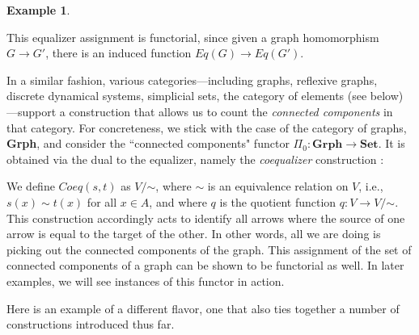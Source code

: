 \documentclass[a4paper]{book}
\theoremstyle{definition}
\newtheorem{example}{Example}[section]
\theoremstyle{definition}
\theoremstyle{definition}
\theoremstyle{theorem}
\theoremstyle{definition}
\begin{document}
\begin{example}
	\begin{center} 
	\end{center} 
	This equalizer assignment is functorial, since given a graph homomorphism $G \rightarrow G'$, there is an induced function $Eq(G) \rightarrow Eq(G')$. \par 
	 In a similar fashion, various categories---including graphs, reflexive graphs, discrete dynamical systems, simplicial sets, the category of elements (see below)---support a construction that allows us to count the \textit{connected components} in that category. For concreteness, we stick with the case of the category of graphs, \textbf{Grph}, and consider the ``connected components"  functor $\Pi_0: \textbf{Grph} \rightarrow \textbf{Set}$. It is obtained via the dual to the equalizer, namely the \textit{coequalizer} construction :
	 \begin{center} 
	 \end{center}
	 We define $Coeq(s,t)$ as $V \big/$$\sim$, where $\sim$ is an equivalence relation on $V$, i.e., $s(x) \sim t(x)$ for all $x \in A$, and where $q$ is the quotient function $q: V \rightarrow V \big/$$\sim$. This construction accordingly acts to identify all arrows where the source of one arrow is equal to the target of the other. In other words, all we are doing is picking out the connected components of the graph. This assignment of the set of connected components of a graph can be shown to be functorial as well. In later examples, we will see instances of this functor in action. 
\end{example}
Here is an example of a different flavor, one that also ties together a number of constructions introduced thus far. 
\end{document}
